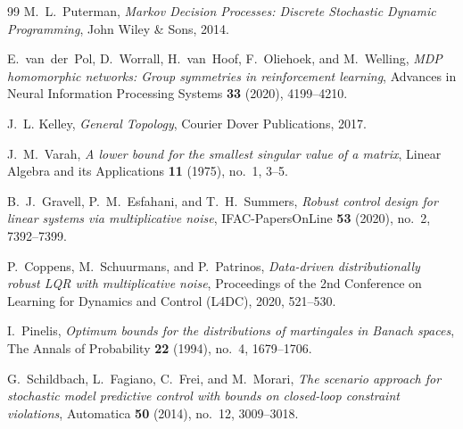 \documentclass[10pt,leqno]{amsart}
\begin{document}
\begin{thebibliography}{99}
M.~L.~Puterman,
\emph{Markov Decision Processes: Discrete Stochastic Dynamic Programming},
John Wiley \& Sons, 2014.

E.~van~der~Pol, D.~Worrall, H.~van~Hoof, F.~Oliehoek, and M.~Welling,
\emph{MDP homomorphic networks: Group symmetries in reinforcement learning},
Advances in Neural Information Processing Systems \textbf{33} (2020), 4199--4210.

J.~L. Kelley,
\textit{General Topology},
Courier Dover Publications, 2017.

J.~M.~Varah,
\emph{A lower bound for the smallest singular value of a matrix},
Linear Algebra and its Applications \textbf{11} (1975), no.~1, 3--5.

%
%
%
%

%

B.~J.~Gravell, P.~M.~Esfahani, and T.~H.~Summers,
\emph{Robust control design for linear systems via multiplicative noise},
IFAC-PapersOnLine \textbf{53} (2020), no.~2, 7392--7399.

P.~Coppens, M.~Schuurmans, and P.~Patrinos,
\emph{Data-driven distributionally robust LQR with multiplicative noise},
Proceedings of the 2nd Conference on Learning for Dynamics and Control (L4DC), 2020, 521--530.

%
%

I.~Pinelis,
\emph{Optimum bounds for the distributions of martingales in Banach spaces},
The Annals of Probability \textbf{22} (1994), no.~4, 1679--1706.

%
%

G.~Schildbach, L.~Fagiano, C.~Frei, and M.~Morari,
\emph{The scenario approach for stochastic model predictive control with bounds on closed-loop constraint violations},
Automatica \textbf{50} (2014), no.~12, 3009--3018.

%

\end{thebibliography}
\end{document}
